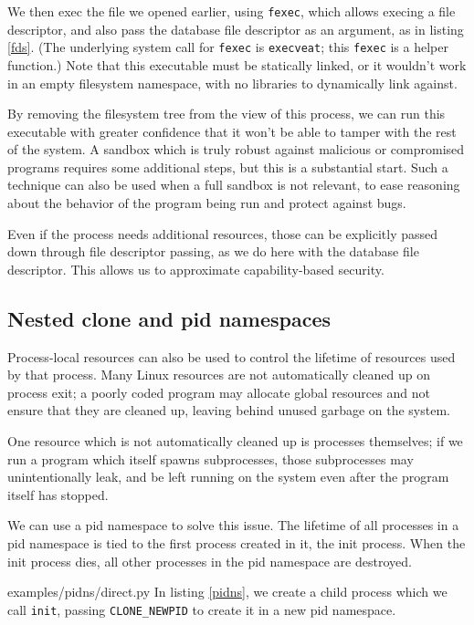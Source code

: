 \documentclass[letterpaper,twocolumn,10pt]{article}
\begin{document}
We then exec the file we opened earlier, using \texttt{fexec},
which allows execing a file descriptor,
and also pass the database file descriptor as an argument,
as in listing \ref{fds}.
(The underlying system call for \texttt{fexec} is \texttt{execveat};
this \texttt{fexec} is a helper function.)
Note that this executable must be statically linked,
or it wouldn't work in an empty filesystem namespace,
with no libraries to dynamically link against.

By removing the filesystem tree from the view of this process,
we can run this executable with greater confidence
that it won't be able to tamper with the rest of the system.
A sandbox which is truly robust against malicious or compromised programs requires some additional steps,
but this is a substantial start.
Such a technique can also be used when a full sandbox is not relevant,
to ease reasoning about the behavior of the program being run
and protect against bugs.

Even if the process needs additional resources,
those can be explicitly passed down through file descriptor passing,
as we do here with the database file descriptor.
This allows us to approximate capability-based security\cite{capsicum}.
\subsection{Nested clone and pid namespaces}
Process-local resources can also be used to control the lifetime of resources used by that process.
Many Linux resources are not automatically cleaned up on process exit;
a poorly coded program may allocate global resources
and not ensure that they are cleaned up,
leaving behind unused garbage on the system.

One resource which is not automatically cleaned up is processes themselves;
if we run a program which itself spawns subprocesses,
those subprocesses may unintentionally leak,
and be left running on the system even after the program itself has stopped.

We can use a pid namespace to solve this issue.
The lifetime of all processes in a pid namespace is tied to the first process created in it,
the init process.
When the init process dies,
all other processes in the pid namespace are destroyed.


{examples/pidns/direct.py}
In listing \ref{pidns},
we create a child process which we call \texttt{init},
passing \verb|CLONE_NEWPID| to create it in a new pid namespace.
\end{document}
